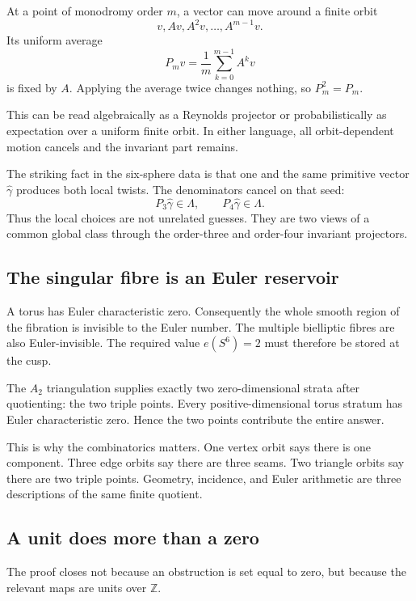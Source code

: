 \documentclass[11pt,reqno]{amsart}
\numberwithin{equation}{section}
\newcommand{\Z}{\mathbb Z}
\newcommand{\wideg}{\widehat\gamma}
\theoremstyle{definition}
\begin{document}
At a point of monodromy order $m$, a vector can move around a finite orbit
\[
v,Av,A^2v,\ldots,A^{m-1}v.
\]
Its uniform average
\[
P_mv=\frac1m\sum_{k=0}^{m-1}A^kv
\]
is fixed by $A$. Applying the average twice changes nothing, so $P_m^2=P_m$.

This can be read algebraically as a Reynolds projector or probabilistically as expectation over a uniform finite orbit. In either language, all orbit-dependent motion cancels and the invariant part remains.

The striking fact in the six-sphere data is that one and the same primitive vector $\wideg$ produces both local twists. The denominators cancel on that seed:
\[
P_3\wideg\in\Lambda,
\qquad
P_4\wideg\in\Lambda.
\]
Thus the local choices are not unrelated guesses. They are two views of a common global class through the order-three and order-four invariant projectors.

\subsection{The singular fibre is an Euler reservoir}

A torus has Euler characteristic zero. Consequently the whole smooth region of the fibration is invisible to the Euler number. The multiple bielliptic fibres are also Euler-invisible. The required value $e(S^6)=2$ must therefore be stored at the cusp.

The $A_2$ triangulation supplies exactly two zero-dimensional strata after quotienting: the two triple points. Every positive-dimensional torus stratum has Euler characteristic zero. Hence the two points contribute the entire answer.

This is why the combinatorics matters. One vertex orbit says there is one component. Three edge orbits say there are three seams. Two triangle orbits say there are two triple points. Geometry, incidence, and Euler arithmetic are three descriptions of the same finite quotient.

\subsection{A unit does more than a zero}

The proof closes not because an obstruction is set equal to zero, but because the relevant maps are units over $\Z$.
\end{document}
